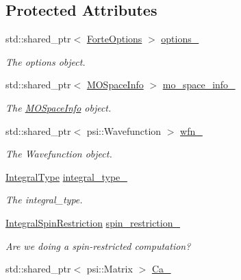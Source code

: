 \subsection*{Protected Attributes}
\begin{DoxyCompactItemize}
\item 
std\+::shared\+\_\+ptr$<$ \mbox{\hyperlink{classforte_1_1_forte_options}{Forte\+Options}} $>$ \mbox{\hyperlink{classforte_1_1_forte_integrals_afdf67caea315c0734445593bca936c1f}{options\+\_\+}}
\begin{DoxyCompactList}\small\item\em The options object. \end{DoxyCompactList}\item 
std\+::shared\+\_\+ptr$<$ \mbox{\hyperlink{classforte_1_1_m_o_space_info}{M\+O\+Space\+Info}} $>$ \mbox{\hyperlink{classforte_1_1_forte_integrals_a3dce6aa1e684a583f2cd947450f4b6f6}{mo\+\_\+space\+\_\+info\+\_\+}}
\begin{DoxyCompactList}\small\item\em The \mbox{\hyperlink{classforte_1_1_m_o_space_info}{M\+O\+Space\+Info}} object. \end{DoxyCompactList}\item 
std\+::shared\+\_\+ptr$<$ psi\+::\+Wavefunction $>$ \mbox{\hyperlink{classforte_1_1_forte_integrals_aa054ac658980cf98f4f614fc34e4e0dd}{wfn\+\_\+}}
\begin{DoxyCompactList}\small\item\em The Wavefunction object. \end{DoxyCompactList}\item 
\mbox{\hyperlink{namespaceforte_a790e7e85ac0911c4c9494622496d95e6}{Integral\+Type}} \mbox{\hyperlink{classforte_1_1_forte_integrals_a8b8716d114d065e97c564b98c9329d37}{integral\+\_\+type\+\_\+}}
\begin{DoxyCompactList}\small\item\em The integral\+\_\+type. \end{DoxyCompactList}\item 
\mbox{\hyperlink{namespaceforte_a7defa2660dd3eb07aa81176b90781be7}{Integral\+Spin\+Restriction}} \mbox{\hyperlink{classforte_1_1_forte_integrals_ae3d3d96dbaaa25e3fad5c97b65339f08}{spin\+\_\+restriction\+\_\+}}
\begin{DoxyCompactList}\small\item\em Are we doing a spin-\/restricted computation? \end{DoxyCompactList}\item 
std\+::shared\+\_\+ptr$<$ psi\+::\+Matrix $>$ \mbox{\hyperlink{classforte_1_1_forte_integrals_a5e3363b0a9b53f384ce80052cd1171d2}{Ca\+\_\+}}

\end{DoxyCompactItemize}
